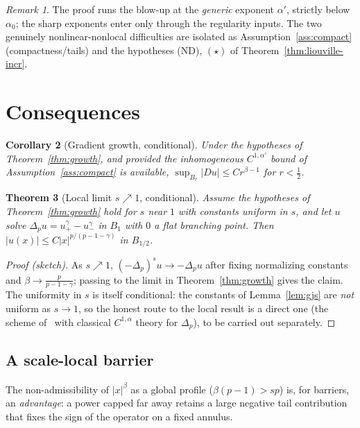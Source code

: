 \documentclass[11pt]{amsart}
\theoremstyle{plain}
\newtheorem{theorem}{Theorem}[section]
\newtheorem{corollary}[theorem]{Corollary}
\theoremstyle{definition}
\theoremstyle{remark}
\newtheorem{remark}[theorem]{Remark}
\newcommand{\fpl}[1]{(-\Delta_p)^{s}#1}
\newcommand{\al}{\alpha}
\begin{document}
\begin{remark}
The proof runs the blow-up at the \emph{generic} exponent $\al'$, strictly
below $\al_0$; the sharp exponents enter only through the regularity inputs.
The two genuinely nonlinear-nonlocal difficulties are isolated as
Assumption~\ref{ass:compact} (compactness/tails) and the hypotheses
\textnormal{(ND)}, $(\star)$ of Theorem~\ref{thm:liouville-incr}.
\end{remark}

\section{Consequences}\label{sec:consequences}
\begin{corollary}[Gradient growth, conditional]\label{cor:grad}
Under the hypotheses of Theorem~\ref{thm:growth}, and provided the
inhomogeneous $C^{1,\al'}$ bound of Assumption~\ref{ass:compact} is available,
$\sup_{B_r}|Du|\le Cr^{\beta-1}$ for $r<\frac12$.
\end{corollary}

\begin{theorem}[Local limit $s\nearrow1$, conditional]\label{thm:local}
Assume the hypotheses of Theorem~\ref{thm:growth} hold for $s$ near $1$ with
constants uniform in $s$, and let $u$ solve
$\Delta_p u=u_+^\gamma-u_-^\gamma$ in $B_1$ with $0$ a flat branching point.
Then $|u(x)|\le C|x|^{p/(p-1-\gamma)}$ in $B_{1/2}$.
\end{theorem}
\begin{proof}[Proof (sketch)]
As $s\nearrow1$, $\fpl{u}\to-\Delta_p u$ after fixing normalizing constants and
$\beta\to\frac{p}{p-1-\gamma}$; passing to the limit in
Theorem~\ref{thm:growth} gives the claim. The uniformity in $s$ is itself
conditional: the constants of Lemma~\ref{lem:gjs} are \emph{not} uniform as
$s\to1$, so the honest route to the local result is a direct one (the scheme
of~\cite[\S6]{CP} with classical $C^{1,\al}$ theory for $\Delta_p$), to be
carried out separately.
\end{proof}

\subsection{A scale-local barrier}\label{ssec:barrier}
The non-admissibility of $|x|^{\beta}$ as a global profile ($\beta(p-1)>sp$) is,
for barriers, an \emph{advantage}: a power capped far away retains a large
negative tail contribution that fixes the sign of the operator on a fixed
annulus.
\end{document}

